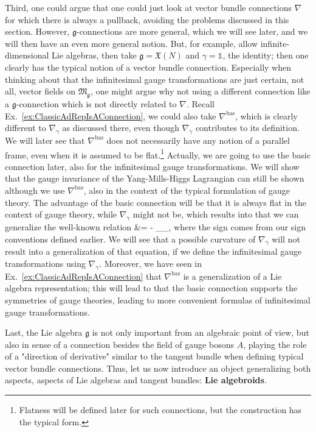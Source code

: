 Third, one could argue that one could just look at vector bundle connections $\nabla$ for which there is always a pullback, avoiding the problems discussed in this section. However, $\mathfrak{g}$-connections are more general, which we will see later, and we will then have an even more general notion. But, for example, allow infinite-dimensional Lie algebras, then take $\mathfrak{g} = \mathfrak{X}(N)$ and $\gamma = \mathds{1}$, the identity; then one clearly has the typical notion of a vector bundle connection. Especially when thinking about that the infinitesimal gauge transformations are just certain, not all, vector fields on $\mathfrak{M}_{\mathfrak{g}}$, one might argue why not using a different connection like a $\mathfrak{g}$-connection which is not directly related to $\nabla$. Recall Ex.~\ref{ex:ClassicAdRepIsAConnection}, we could also take $\nabla^{\mathrm{bas}}$, which is clearly different to $\nabla_\gamma$ as discussed there, even though $\nabla_\gamma$ contributes to its definition. We will later see that $\nabla^{\mathrm{bas}}$ does not necessarily have any notion of a parallel frame, even when it is assumed to be flat.\footnote{Flatness will be defined later for such connections, but the construction has the typical form.}
Actually, we are going to use the basic connection later, also for the infinitesimal gauge transformations. We will show that the gauge invariance of the Yang-Mills-Higgs Lagrangian can still be shown although we use $\nabla^{\mathrm{bas}}$, also in the context of the typical formulation of gauge theory. The advantage of the basic connection will be that it is always flat in the context of gauge theory, while $\nabla_\gamma$ might not be, which results into that we can generalize the well-known relation
\bas
\mleft[ \delta_\varepsilon, \delta_\varepsilon^\prime \mright]
&=
- \delta_{\mleft[ \varepsilon, \varepsilon^\prime \mright]_{}},
\eas
where the sign comes from our sign conventions defined earlier. We will see that a possible curvature of $\nabla_\gamma$ will not result into a generalization of that equation, if we define the infinitesimal gauge transformations using $\nabla_\gamma$. Moreover, we have seen in Ex.~\ref{ex:ClassicAdRepIsAConnection} that $\nabla^{\mathrm{bas}}$ is a generalization of a Lie algebra representation; this will lead to that the basic connection supports the symmetries of gauge theories, leading to more convenient formulas of infinitesimal gauge transformations.

Last, the Lie algebra $\mathfrak{g}$ is not only important from an algebraic point of view, but also in sense of a connection besides the field of gauge bosons $A$, playing the role of a "direction of derivative" similar to the tangent bundle when defining typical vector bundle connections. Thus, let us now introduce an object generalizing both aspects, aspects of Lie algebras and tangent bundles: \textbf{Lie algebroids}.